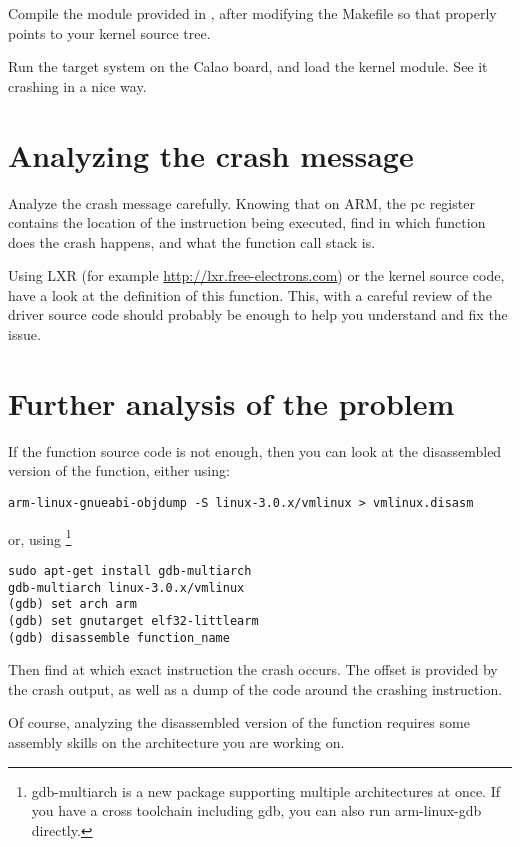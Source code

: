 Compile the  module provided
  in , after modifying the Makefile so
  that  properly points to your kernel source tree.

Run the target system on the Calao board, and load the 
kernel module. See it crashing in a nice way.

\section{Analyzing the crash message}

Analyze the crash message carefully. Knowing that on ARM, the pc
register contains the location of the instruction being executed, find
in which function does the crash happens, and what the function call
stack is.

Using LXR (for example \url{http://lxr.free-electrons.com}) or the
kernel source code, have a look at the definition of this
function. This, with a careful review of the driver source code should
probably be enough to help you understand and fix the issue.

\section{Further analysis of the problem}

If the function source code is not enough, then you can look at the
disassembled version of the function, either using:

\begin{verbatim}
arm-linux-gnueabi-objdump -S linux-3.0.x/vmlinux > vmlinux.disasm
\end{verbatim}

or, using \footnote{gdb-multiarch is a new package
  supporting multiple architectures at once. If you have a cross
  toolchain including gdb, you can also run arm-linux-gdb directly.}

\begin{verbatim}
sudo apt-get install gdb-multiarch
gdb-multiarch linux-3.0.x/vmlinux
(gdb) set arch arm
(gdb) set gnutarget elf32-littlearm
(gdb) disassemble function_name
\end{verbatim}

Then find at which exact instruction the crash occurs. The offset is
provided by the crash output, as well as a dump of the code around the
crashing instruction.

Of course, analyzing the disassembled version of the function requires
some assembly skills on the architecture you are working on.
